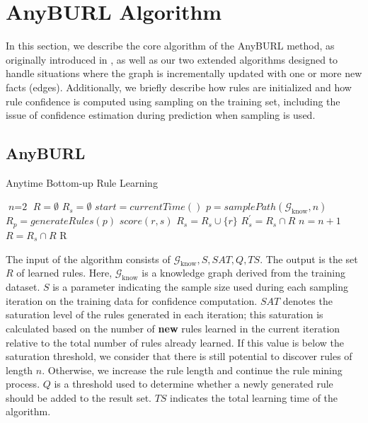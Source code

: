 \section{AnyBURL Algorithm} \label{myalgorithm}
In this section, we describe the core algorithm of the AnyBURL method, as originally introduced in \cite{burl}, as well as our two extended algorithms designed to handle situations where the graph is incrementally updated with one or more new facts (edges). Additionally, we briefly describe how rules are initialized and how rule confidence is computed using sampling on the training set, including the issue of confidence estimation during prediction when sampling is used.


\subsection{AnyBURL}
\begin{algorithm}[H]
	\caption{Anytime Bottom-up Rule Learning}\label{algorithm1}
	\begin{algorithmic}[1]
		\State $\textit{n} = \text{2}$
		\State $R = \emptyset$
		\Loop
		\State $R_s = \emptyset$
		\State $start = currentTime()$
		\Repeat
		\State $p = samplePath(\mathcal{G}_{\text{know}}, n)$
		\State $R_p = generateRules(p)$
		\State $score(r, s)$
		\State $R_s = R_s \cup \{r\}$
		\EndIf
		\EndFor
		\State $R^{\prime}_s = R_s \cap R$
		\State $n = n + 1$
		\EndIf
		\State $R = R_s \cap R$
		\EndLoop
		\Return R
		\EndProcedure
	\end{algorithmic}
\end{algorithm}

The input of the algorithm consists of \(\mathcal{G}_{\text{know}}, S, SAT, Q, TS\). The output is the set \(R\) of learned rules. Here, \(\mathcal{G}_{\text{know}}\) is a knowledge graph derived from the training dataset. \(S\) is a parameter indicating the sample size used during each sampling iteration on the training data for confidence computation. \(SAT\) denotes the saturation level of the rules generated in each iteration; this saturation is calculated based on the number of \textbf{new} rules learned in the current iteration relative to the total number of rules already learned. If this value is below the saturation threshold, we consider that there is still potential to discover rules of length \(n\). Otherwise, we increase the rule length and continue the rule mining process. \(Q\) is a threshold used to determine whether a newly generated rule should be added to the result set. \(TS\) indicates the total learning time of the algorithm.

